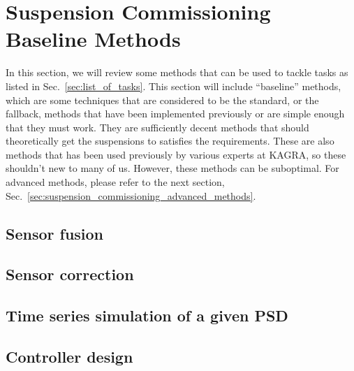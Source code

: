 \section{Suspension Commissioning Baseline Methods \label{sec:suspension_commissioning_baseline_methods}}
In this section, we will review some methods that can be used to tackle tasks as listed in Sec.~\ref{sec:list_of_tasks}.
This section will include ``baseline'' methods, which are some techniques that are considered to be the standard, or the fallback, methods that have been implemented previously or are simple enough that they must work.
They are sufficiently decent methods that should theoretically get the suspensions to satisfies the requirements.
These are also methods that has been used previously by various experts at KAGRA, so these shouldn't new to many of us.
However, these methods can be suboptimal.
For advanced methods, please refer to the next section, Sec.~\ref{sec:suspension_commissioning_advanced_methods}.






\subsection{Sensor fusion}
\subsection{Sensor correction}
\subsection{Time series simulation of a given PSD}
\subsection{Controller design}

